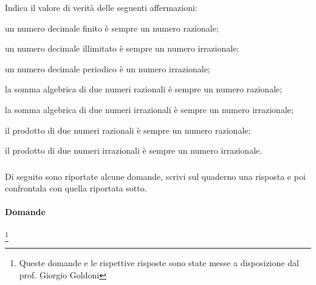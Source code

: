 \begin{esercizio}
\label{ese:1.7}
Indica il valore di verità delle seguenti affermazioni:
\begin{enumeratea}
\item un numero decimale finito è sempre un numero razionale;
\item un numero decimale illimitato è sempre un numero irrazionale;
\item un numero decimale periodico è un numero irrazionale;
\item la somma algebrica di due numeri razionali è sempre un numero razionale;
\item la somma algebrica di due numeri irrazionali è sempre un numero 
irrazionale;
\item il prodotto di due numeri razionali è sempre un numero razionale;
\item il prodotto di due numeri irrazionali è sempre un numero irrazionale.
\end{enumeratea}
\end{esercizio}

\subsubsection*{}

Di seguito sono riportate alcune domande, scrivi sul quaderno una risposta e 
poi confrontala con quella riportata sotto.

\paragraph{Domande}
\footnote{Queste domande e le rispettive risposte sono state messe a 
disposizione dal prof. Giorgio Goldoni}

